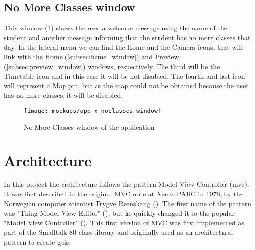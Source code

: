 	\subsection{No More Classes window}
	\label{subsec:no_classes}
	This window (\ref{fig:no_classes_window}) shows the user a welcome message using the name of the student and another message informing that the student has no more classes that day. In the lateral menu we can find the Home and the Camera icons, that will link with the Home (\ref{subsec:home_window}) and Preview (\ref{subsec:preview_window}) windows, respectively. The third will be the Timetable icon and in this case it will be not disabled.
	The fourth and last icon will represent a Map pin, but as the map could not be obtained because the user has no more classes, it will be disabled.

	\begin{figure}[!ht]
		\centering
		\texttt{[image: mockups/app\_x\_noclasses\_window]}
		\caption{No More Classes window of the application}
		\label{fig:no_classes_window}
	\end{figure}	

\newpage

                                                                                              

\section{Architecture}
\label{sec:architecture}
In this project the architecture follows the pattern Model-View-Controller (\gls{mvc}). It was first described in the original MVC note at Xerox PARC in 1978, by the Norwegian computer scientist Trygve Reenskaug (\cite{mvc_origin}). The first name of the pattern was "Thing Model View Editor" (\cite{tmve_reenskaug_1979}), but he quickly changed it to the popular "Model View Controller" (\cite{mvc_reenskaug_1979}). This first version of MVC was first implemented as part of the Smalltalk-80 class library and originally used as an architectural pattern to create \glspl{gui}.

